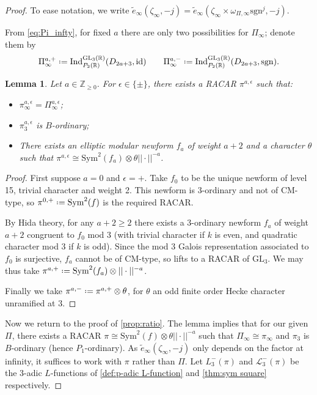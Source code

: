 \documentclass[10pt,a4paper]{amsart}
\newtheorem{lemma}{Lemma}
\newcommand{\GL}{\mathrm{GL}}
\newcommand{\R}{\mathbb{R}}
\newcommand{\Z}{\mathbb{Z}}
\newcommand{\cL}{\mathcal{L}}
\newcommand*{\defeq}{\mathrel{\vcenter{\baselineskip0.5ex \lineskiplimit0pt
                     \hbox{\scriptsize.}\hbox{\scriptsize.}}}%
                     =}
\begin{document}
\begin{proof}
	 To ease notation, we write $\widetilde{e}_\infty(\zeta_\infty,-j) = \widetilde{e}_\infty(\zeta_\infty \times \omega_{\Pi,\infty}\mathrm{sgn}^j,-j)$. 
	
From \eqref{eq:Pi_infty}, for fixed $a$ there are only two possibilities for $\Pi_\infty$; denote them by
\[
\Pi_\infty^{a,+} \defeq \mathrm{Ind}_{P_2(\R)}^{\GL_3(\R)} (D_{2a+3}, \mathrm{id}) \qquad \Pi_\infty^{a,-} \defeq \mathrm{Ind}_{P_2(\R)}^{\GL_3(\R)} (D_{2a+3}, \mathrm{sgn}).
\]

\begin{lemma}
	Let $a \in \Z_{\geq 0}$. For $\epsilon \in \{\pm\}$, there exists a RACAR $\pi^{a,\epsilon}$ such that:
	\begin{itemize}
		\item[(i)] $\pi^{a,\epsilon}_\infty = \Pi_{\infty}^{a,\epsilon}$;
		\item[(ii)] $\pi^{a,\epsilon}_3$ is $B$-ordinary;
		\item[(iii)] There exists an elliptic modular newform $f_a$ of weight $a+2$ and a character $\theta$ such that $\pi^{a,\epsilon} \cong \mathrm{Sym}^2(f_a)\otimes \theta||\cdot||^{-a}$.
	\end{itemize}
\end{lemma}
\begin{proof}
	First suppose $a = 0$ and $\epsilon = +$. Take $f_0$ to be the unique newform of level 15, trivial character and weight 2. This newform is 3-ordinary and not of CM-type, so $\pi^{0,+} \defeq \mathrm{Sym}^2(f)$ is the required RACAR.

	By Hida theory, for any $a+2 \ge 2$ there exists a 3-ordinary newform $f_a$ of weight $a+2$ congruent to $f_0$ mod 3 (with trivial character if $k$ is even, and quadratic character mod 3 if $k$ is odd). Since the mod 3 Galois representation associated to $f_0$ is surjective, $f_a$ cannot be of CM-type, so lifts to a RACAR of $\GL_3$. We may thus take $\pi^{a,+}\defeq \mathrm{Sym}^2(f_a)\otimes||\cdot||^{-a}$.

	Finally we take $\pi^{a,-} \defeq \pi^{a,+} \otimes \theta$, for $\theta$ an odd finite order Hecke character unramified at $3$.
\end{proof}


Now we return to the proof of \cref{prop:ratio}. The lemma implies that for our given $\Pi$, there exists a RACAR $\pi \cong \mathrm{Sym}^2(f) \otimes \theta||\cdot||^{-a}$ such that $\Pi_\infty \cong \pi_\infty$ and $\pi_3$ is $B$-ordinary (hence $P_1$-ordinary). As $\widetilde{e}_\infty(\zeta_\infty,-j)$ only depends on the factor at infinity, it suffices to work with $\pi$ rather than $\Pi$. Let $L_3^-(\pi)$ and $\cL_3^-(\pi)$ be the $3$-adic $L$-functions of \cref{def:p-adic L-function} and \cref{thm:sym square} respectively.


\end{proof}
\end{document}
